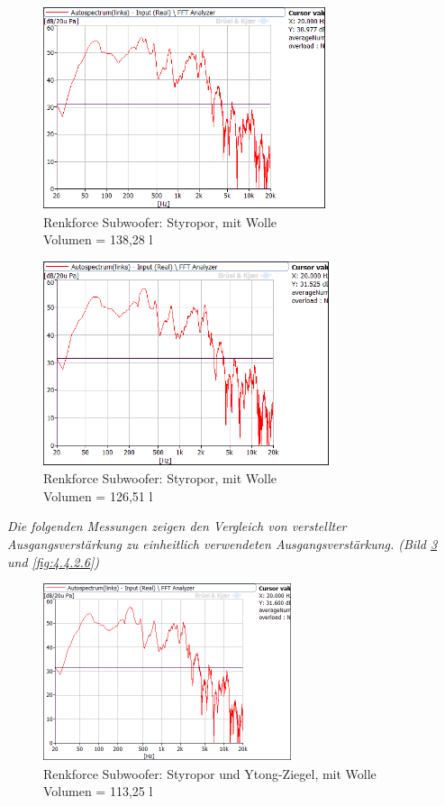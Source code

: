 \begin{figure} [H]
\centering
\includegraphics[width=0.74\textwidth]{img/Optimierung/Sub/RenkforceStyro_138l_Wolle.png}
\caption{Renkforce Subwoofer: Styropor, mit Wolle \\Volumen = 138,28 l}
\label{fig:4.4.2.3}
\end{figure}

\begin{figure} [H]
\centering
\includegraphics[width=0.75\textwidth]{img/Optimierung/Sub/RenkforceStyro_126l_Wolle.png}
\caption{Renkforce Subwoofer: Styropor, mit Wolle \\Volumen = 126,51 l}
\label{fig:4.4.2.4}
\end{figure}

\newpage
\textit{Die folgenden Messungen zeigen den Vergleich von verstellter Ausgangsverstärkung zu einheitlich verwendeten Ausgangsverstärkung. (Bild \ref{fig:4.4.2.5} und \ref{fig:4.4.2.6})}
\begin{figure} [H]
\centering
\includegraphics[width=0.65\textwidth]{img/Optimierung/Sub/RenkforceStyro_113l_Wolle.png}
\caption{Renkforce Subwoofer: Styropor und Ytong-Ziegel, mit Wolle \\Volumen = 113,25 l}
\label{fig:4.4.2.5}
\end{figure}

